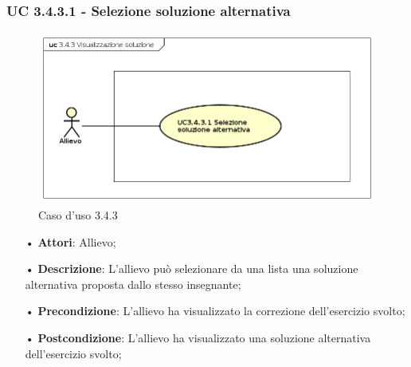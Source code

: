 \subsubsection{UC 3.4.3.1 - Selezione soluzione alternativa}
\begin{figure}[H]
\centering
\includegraphics[width=17cm]{img/UC343.png} 
\caption{Caso d'uso 3.4.3}\label{fig:343}
\end{figure}
\begin{itemize}
\item[•]\textbf{Attori}: Allievo;
\item[•]\textbf{Descrizione}: L’allievo può selezionare da una lista una soluzione alternativa proposta dallo stesso insegnante;
\item[•]\textbf{Precondizione}: L’allievo ha visualizzato la correzione dell’esercizio svolto;
\item[•]\textbf{Postcondizione}: L’allievo ha visualizzato una soluzione alternativa dell’esercizio svolto;
\end{itemize}


